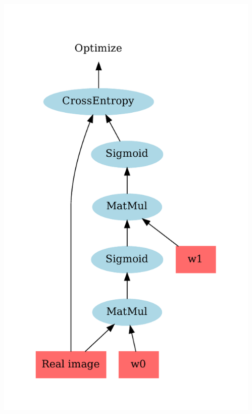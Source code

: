 \documentclass{beamer}
\begin{document}
\begin{frame}
\begin{columns}
\begin{column}{0.5\textwidth}
	\includegraphics[width=\textwidth]{cross_entropy.pdf}
	\pause
\end{column}
\begin{column}{0.5\textwidth}  %

\end{column}
\end{columns}
\end{frame}
\end{document}
